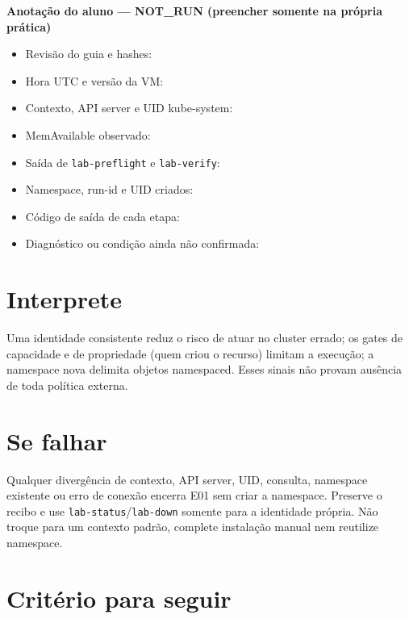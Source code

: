 \documentclass[12pt,openany,oneside,a4paper,chapter=TITLE,english,brazil]{abntex2}
\providecommand{\tightlist}{\setlength{\itemsep}{0pt}\setlength{\parskip}{0pt}}
\begin{document}
\textbf{Anotação do aluno --- NOT\_RUN (preencher somente na própria prática)}

\begin{itemize}
\tightlist
\item
  Revisão do guia e hashes: \hrulefill
\item
  Hora UTC e versão da VM: \hrulefill
\item
  Contexto, API server e UID kube-system: \hrulefill
\item
  MemAvailable observado: \hrulefill
\item
  Saída de \texttt{lab-{}\allowbreak{}preflight} e \texttt{lab-{}\allowbreak{}verify}: \hrulefill
\item
  Namespace, run-id e UID criados: \hrulefill
\item
  Código de saída de cada etapa: \hrulefill
\item
  Diagnóstico ou condição ainda não confirmada: \hrulefill
\end{itemize}

\section*{Interprete}\label{interprete}

Uma identidade consistente reduz o risco de atuar no cluster errado; os gates de capacidade e de propriedade (quem criou o recurso) limitam a execução; a namespace nova delimita objetos namespaced. Esses sinais não provam ausência de toda política externa.

\section*{Se falhar}\label{se-falhar}

Qualquer divergência de contexto, API server, UID, consulta, namespace existente ou erro de conexão encerra E01 sem criar a namespace. Preserve o recibo e use \texttt{lab-{}\allowbreak{}status}/\texttt{lab-{}\allowbreak{}down} somente para a identidade própria. Não troque para um contexto padrão, complete instalação manual nem reutilize namespace.

\section*{Critério para seguir}\label{crituxe9rio-para-seguir}
\end{document}
